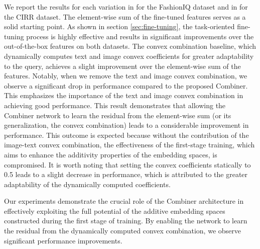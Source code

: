 \documentclass[acmlarge]{acmart}
\begin{document}
We report the results for each variation in  for the FashionIQ dataset and in  for the CIRR dataset.
The element-wise sum of the fine-tuned features serves as a solid starting point. As shown in section \ref{sec:fine-tuning}, the task-oriented fine-tuning process is highly effective and results in significant improvements over the out-of-the-box features on both datasets.
The convex combination baseline, which dynamically computes text and image convex coefficients for greater adaptability to the query, achieves a slight improvement over the element-wise sum of the features.
Notably, when we remove the text and image convex combination, we observe a significant drop in performance compared to the proposed Combiner. This emphasizes the importance of the text and image convex combination in achieving good performance.
This result demonstrates that allowing the Combiner network to learn the residual from the element-wise sum (or its generalization, the convex combination) leads to a considerable improvement in performance. This outcome is expected because without the contribution of the image-text convex combination, the effectiveness of the first-stage training, which aims to enhance the additivity properties of the embedding spaces, is compromised.
It is worth noting that setting the convex coefficients statically to 0.5 leads to a slight decrease in performance, which is attributed to the greater adaptability of the dynamically computed coefficients.

Our experiments demonstrate the crucial role of the Combiner architecture in effectively exploiting the full potential of the additive embedding spaces constructed during the first stage of training. By enabling the network to learn the residual from the dynamically computed convex combination, we observe significant performance improvements.
\end{document}
